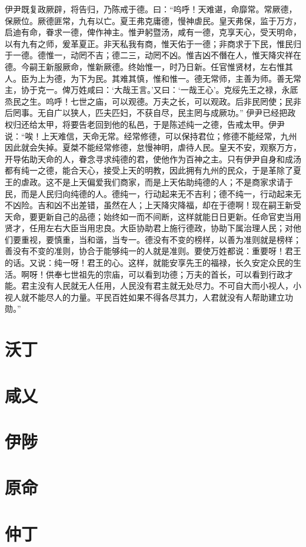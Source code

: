 \documentclass[12pt,UTF8]{ctexbook}
\begin{document}
伊尹既复政厥辟，将告归，乃陈戒于德。曰：“呜呼！天难谌，命靡常。常厥德，保厥位。厥德匪常，九有以亡。夏王弗克庸德，慢神虐民。皇天弗保，监于万方，启迪有命，眷求一德，俾作神主。惟尹躬暨汤，咸有一德，克享天心，受天明命，以有九有之师，爰革夏正。非天私我有商，惟天佑于一德；非商求于下民，惟民归于一德。德惟一，动罔不吉；德二三，动罔不凶。惟吉凶不僭在人，惟天降灾祥在德。今嗣王新服厥命，惟新厥德。终始惟一，时乃日新。任官惟贤材，左右惟其人。臣为上为德，为下为民。其难其慎，惟和惟一。德无常师，主善为师。善无常主，协于克一。俾万姓咸曰：‘大哉王言。’又曰：‘一哉王心’。克绥先王之禄，永厎烝民之生。呜呼！七世之庙，可以观德。万夫之长，可以观政。后非民罔使；民非后罔事。无自广以狭人，匹夫匹妇，不获自尽，民主罔与成厥功。”
伊尹已经把政权归还给太甲，将要告老回到他的私邑，于是陈述纯一之德，告戒太甲。伊尹说：“唉！上天难信，天命无常。经常修德，可以保持君位；修德不能经常，九州因此就会失掉。夏桀不能经常修德，怠慢神明，虐待人民。皇天不安，观察万方，开导佑助天命的人，眷念寻求纯德的君，使他作为百神之主。只有伊尹自身和成汤都有纯一之德，能合天心，接受上天的明教，因此拥有九州的民众，于是革除了夏王的虐政。这不是上天偏爱我们商家，而是上天佑助纯德的人；不是商家求请于民，而是人民归向纯德的人。德纯一，行动起来无不吉利；德不纯一，行动起来无不凶险。吉和凶不出差错，虽然在人；上天降灾降福，却在于德啊！现在嗣王新受天命，要更新自己的品德；始终如一而不间断，这样就能日日更新。任命官吏当用贤才，任用左右大臣当用忠良。大臣协助君上施行德政，协助下属治理人民；对他们要重视，要慎重，当和谐，当专一。德没有不变的榜样，以善为准则就是榜样；善没有不变的准则，协合于能够纯一的人就是准则。要使万姓都说：重要呀！君王的话。又说：纯一呀！君王的心。这样，就能安享先王的福禄，长久安定众民的生活。啊呀！供奉七世祖先的宗庙，可以看到功德；万夫的首长，可以看到行政才能。君主没有人民就无人任用，人民没有君主就无处尽力。不可自大而小视人，小视人就不能尽人的力量。平民百姓如果不得各尽其力，人君就没有人帮助建立功勋。”
\chapter{沃丁}
\chapter{咸乂}
\chapter{伊陟}
\chapter{原命}
\chapter{仲丁}
\end{document}

